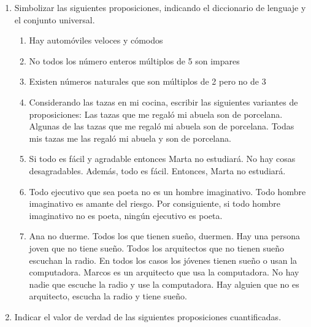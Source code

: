 \documentclass[a4paper]{article}
\newcommand{\exercise}{\item}
\begin{document}
\begin{enumerate}[resume]
\begin{enumerate} [label=(\alph*)]
		\item El producto de dos números números racionales es racional. 
		\item Para cualquier número natural n se verifica que $n^2 - (n-1)^2 < 20$  o que  $n^2 - (n-1)^2 >50$.
		\item Dadas tres rectas no verticales $R_1$, $R_2$ y $R_3$. Si $R_1 \perp  R_2$ y $R_2 \perp  R_3$, entonces $R_1 \parallel  R_3$ o bien $R_1 \sim R_3$.
		\item Si $k>2$, la parábola $x^2+k.x+1$ no tiene raíces.
		\item Si $a.b < 0$ y $|a|>b>0$, la parábola $x^2+a$ tiene dos raíces reales.
	\end{enumerate}
	\exercise Simbolizar las siguientes proposiciones, indicando el diccionario de lenguaje y el conjunto universal.
	\begin{enumerate} [label=(\alph*)]
		\item Hay automóviles veloces y cómodos
		\item No todos los número enteros múltiplos de 5 son impares
		\item Existen números naturales que son múltiplos de 2 pero no de 3
		\item Considerando las tazas en mi cocina, escribir las siguientes variantes de proposiciones: Las tazas que me regaló mi abuela son de porcelana. Algunas de las tazas que me regaló mi abuela son de porcelana. Todas mis tazas me las regaló mi abuela y son de porcelana.
		\item Si todo es fácil y agradable entonces Marta no estudiará. No hay cosas desagradables. Además, todo es fácil. Entonces, Marta no estudiará.
		\item Todo ejecutivo que sea poeta no es un hombre imaginativo. Todo hombre imaginativo es amante del riesgo. Por consiguiente, si todo hombre imaginativo no es poeta, ningún ejecutivo es poeta.
		\item Ana no duerme. Todos los que tienen sueño, duermen. Hay una persona joven que no tiene sueño. Todos los 	arquitectos que no tienen sueño escuchan la radio. En todos los casos los jóvenes tienen sueño o usan la computadora. Marcos es un arquitecto que usa la computadora. No hay nadie que escuche la radio y use la computadora. Hay alguien que no es arquitecto, escucha la radio y tiene sueño.
	\end{enumerate}
	\exercise Indicar el valor de verdad de las siguientes proposiciones cuantificadas. 
	\begin{enumerate} [label=(\alph*)]

\end{enumerate}
\end{enumerate}
\end{document}
